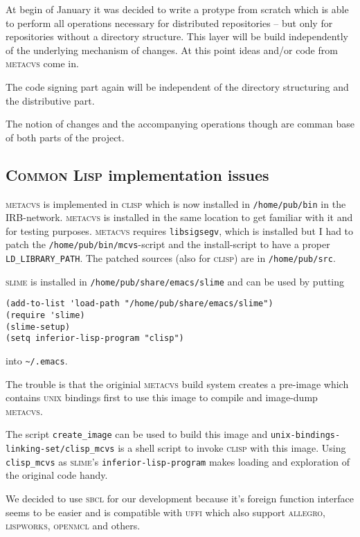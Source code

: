 \documentclass[fleqn, 10pt, a4paper]{report}
\begin{document}
At begin of January it was decided to write a protype from scratch
which is able to perform all operations necessary for
distributed repositories -- but only for repositories without a
directory structure. This layer will be build independently of the
underlying mechanism of changes. At this point ideas and/or code
from \textsc{metacvs} come in.

The code signing part again will be independent of the directory
structuring and the distributive part.

The notion of changes and the accompanying operations though are
comman base of both parts of the project.

\subsection{\textsc{Common Lisp} implementation issues}

\textsc{metacvs} is implemented in \textsc{clisp} which is now installed
in \texttt{/home/pub/bin} in the IRB-network. \textsc{metacvs} is
installed in the same location to get familiar with it and for testing
purposes. \textsc{metacvs} requires \texttt{libsigsegv}, which is
installed but I had to patch the \texttt{/home/pub/bin/mcvs}-script and
the install-script to have a proper \texttt{LD\_LIBRARY\_PATH}. The
patched sources (also for \textsc{clisp}) are in \texttt{/home/pub/src}.

\textsc{slime} is installed in \texttt{/home/pub/share/emacs/slime} and
can be used by putting
\begin{verbatim}
(add-to-list 'load-path "/home/pub/share/emacs/slime")
(require 'slime)
(slime-setup)
(setq inferior-lisp-program "clisp")
\end{verbatim}

into \texttt{\textasciitilde/.emacs}.

The trouble is that the originial \textsc{metacvs} build system
creates a pre-image which contains \textsc{unix} bindings first to use
this image to compile and image-dump \textsc{metacvs}.

The script \texttt{create\_image} can be used to build this image
and \texttt{unix-bindings-linking-set/clisp\_mcvs} is a shell script
to invoke \textsc{clisp} with this image. Using \texttt{clisp\_mcvs}
as \textsc{slime}'s \texttt{inferior-lisp-program} makes loading
and exploration of the original code handy.

We decided to use \textsc{sbcl} for our development because it's
foreign function interface seems to be easier and is compatible with
\textsc{uffi} which also support \textsc{allegro}, \textsc{lispworks},
\textsc{openmcl} and others.
\end{document}
